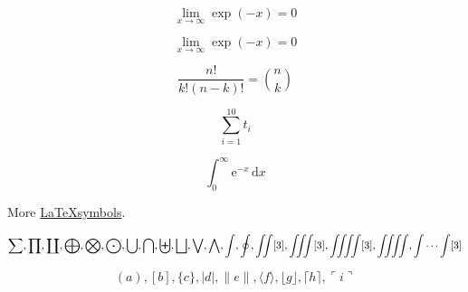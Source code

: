 \begin{equation}\lim_{x \to \infty} \exp(-x) = 0\end{equation}

\begin{equation}\lim_{x \to \infty} \exp(-x) = 0\end{equation}

\begin{equation} \frac{n!}{k!(n-k)!} = \binom{n}{k}\end{equation}

\begin{equation} \displaystyle\sum_{i=1}^{10} t_i\end{equation}

\begin{equation} \int_0^\infty \mathrm{e}^{-x}\,\mathrm{d}x
\end{equation}

More \href{https://artofproblemsolving.com/wiki/index.php/LaTeX:Symbols}{\LaTeX \space symbols}.

$$
\sum, \prod,	\coprod, \bigoplus, \bigotimes,	\bigodot, \bigcup, \bigcap,\biguplus,\bigsqcup,\bigvee,\bigwedge,\int,\oint,\iint[3],\iiint[3],\iiiint[3],\iiiint,\idotsint[3]
$$

$$
( a ), [ b ], \{ c \}, | d |, \| e \|,
\langle f \rangle, \lfloor g \rfloor,
\lceil h \rceil, \ulcorner i \urcorner
$$






